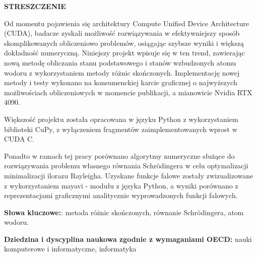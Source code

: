 \noindent
\begingroup
\fontsize{12pt}{1.5pt}\selectfont
\textbf{STRESZCZENIE}
\endgroup

\vspace{3mm}

Od momentu pojawienia się architektury Compute Unified Device Architecture (CUDA), badacze zyskali możliwość rozwiązywania w efektywniejszy sposób skomplikowanych obliczeniowo problemów, osiągając szybsze wyniki i większą dokładność numeryczną. Niniejszy projekt wpisuje się w ten trend, zawierając nową metodę obliczania stanu podstawowego i stanów wzbudzonych atomu wodoru z wykorzystaniem metody różnic skończonych. Implementację nowej metody i testy wykonano na konsumenckiej karcie graficznej o najwyższych możliwościach obliczeniowych w momencie publikacji, a mianowicie Nvidia RTX 4090.

Większość projektu została opracowana w języku Python z wykorzystaniem biblioteki CuPy, z wyłączeniem fragmentów zaimplementowanych wprost w CUDA C.

Ponadto w ramach tej pracy porównano algorytmy numeryczne służące do rozwiązywania problemu własnego równania Schr{\"o}dingera w celu optymalizacji minimalizacji ilorazu Rayleigha. Uzyskane funkcje falowe zostały zwizualizowane z wykorzystaniem mayavi - modułu z języka Python, a wyniki porównano z reprezentacjami graficznymi analitycznie wyprowadzonych funkcji falowych.

\textbf{Słowa kluczowe:}: metoda różnic skończonych, równanie Schrödingera, atom wodoru.

\textbf{Dziedzina i dyscyplina naukowa zgodnie z wymaganiami OECD:}
nauki komputerowe i informatyczne, informatyka